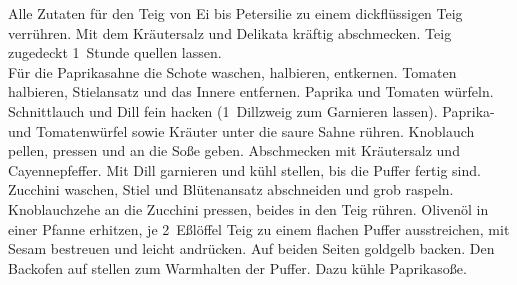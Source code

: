       \begin{zubereitung}
        Alle Zutaten für den Teig von Ei bis Petersilie zu einem dickflüssigen
	Teig verrühren. Mit dem Kräutersalz und Delikata kräftig abschmecken.
	Teig zugedeckt 1~Stunde quellen lassen. \\
        Für die Paprikasahne die Schote waschen, halbieren, entkernen. Tomaten
	halbieren, Stielansatz und das Innere entfernen. Paprika und Tomaten
	würfeln. Schnittlauch und Dill fein hacken (1~Dillzweig zum Garnieren
	lassen). Paprika- und Tomatenwürfel sowie Kräuter unter die saure Sahne
	rühren. Knoblauch pellen, pressen und an die Soße geben. Abschmecken
	mit Kräutersalz und Cayennepfeffer. Mit Dill garnieren und kühl
	stellen, bis die Puffer fertig sind. \\
        Zucchini waschen, Stiel und Blütenansatz abschneiden und grob raspeln.
	Knoblauchzehe an die Zucchini pressen, beides in den Teig rühren.
	Olivenöl in einer Pfanne erhitzen, je 2~Eßlöffel Teig zu einem flachen
	Puffer ausstreichen, mit Sesam bestreuen und leicht andrücken. Auf
	beiden Seiten goldgelb backen. Den Backofen auf  stellen zum
	Warmhalten der Puffer. Dazu kühle Paprikasoße. \\
      \end{zubereitung}


